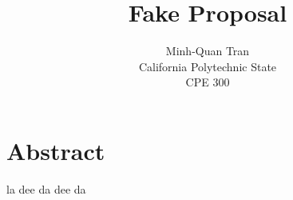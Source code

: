 

\title{Fake Proposal}
\author{Minh-Quan Tran\\
 California Polytechnic State\\
 CPE 300}
\maketitle


\section{Abstract}

la dee da dee da


\pagebreak
\tableofcontents
\pagebreak